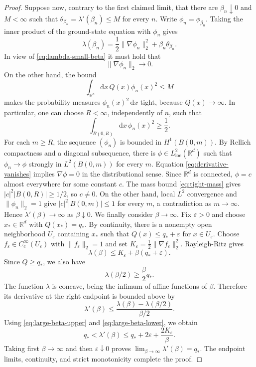 \documentclass[11pt,reqno]{amsart}
\theoremstyle{definition}
\numberwithin{equation}{section}
\newcommand{\<}{\langle}
\renewcommand{\>}{\rangle}
\def\de{{\rm d}}
\def\de{{\mathrm {d}}}
\begin{document}
\begin{appendix}
\begin{proof}
Suppose now, contrary to the first claimed limit, that there are
$\beta_n\downarrow0$ and $M<\infty$ such that $\theta_{\beta_n}=\lambda'(\beta_n)\leq M$ for every $n$.
Write $\phi_n=\phi_{\beta_n}$.  Taking the inner product of the
ground-state equation with $\phi_n$ gives
\[
    \lambda(\beta_n)
    =\frac12\|\nabla\phi_n\|_2^2
      +\beta_n\theta_{\beta_n}.
\]
In view of \eqref{eq:lambda-small-beta} it must hold that
\begin{equation}
    \|\nabla\phi_n\|_2\longrightarrow0.
\label{eq:derivative-vanishes}
\end{equation}
On the other hand, the bound
\[
    \int_{\mathbb R^d}\de x \, Q(x) \phi_n(x)^2 \leq M
\]
makes the probability measures $\phi_n(x)^2\,\mathrm dx$ tight, because
$Q(x)\to\infty$.  In particular, one can choose $R<\infty$, independently
of $n$, such that
\begin{equation}
    \int_{B(0,R)} \de x \, \phi_n(x)^2\geq\frac12.
\label{eq:tight-mass}
\end{equation}
For each $m\geq R$, the sequence $(\phi_n)$ is bounded in $H^1(B(0,m))$.
By Rellich compactness and a diagonal subsequence, there is
$\phi\in L^2_{\mathrm{loc}}(\mathbb R^d)$ such that
$\phi_n\to\phi$ strongly in $L^2(B(0,m))$ for every $m$.  Equation
\eqref{eq:derivative-vanishes} implies $\nabla\phi=0$ in the distributional
sense.  Since $\mathbb R^d$ is connected, $\phi=c$ almost everywhere for
some constant $c$.  The mass bound \eqref{eq:tight-mass} gives
$|c|^2|B(0,R)|\geq1/2$, so $c\neq0$.  On the other hand, local $L^2$
convergence and $\|\phi_n\|_2=1$ give
$|c|^2|B(0,m)|\leq1$ for every $m$, a contradiction as $m\to\infty$.
Hence
$\lambda'(\beta)\to\infty$ as $\beta\downarrow0$.
We finally consider $\beta\to\infty$.  Fix $\varepsilon>0$ and choose
$x_*\in\mathbb R^d$ with $Q(x_*)=q_*$.  By continuity, there is a nonempty
open neighborhood $U_\varepsilon$ containing $x_*$ such that $Q(x)\leq q_*+\varepsilon$ for $x\in U_\varepsilon$.
Choose $f_\varepsilon\in C_c^\infty(U_\varepsilon)$ with
$\|f_\varepsilon\|_2=1$ and set $K_\varepsilon=\frac12\|\nabla f_\varepsilon\|_2^2$.
Rayleigh-Ritz gives
\begin{equation}
    \lambda(\beta)
    \leq K_\varepsilon+\beta(q_*+\varepsilon).
\label{eq:large-beta-upper}
\end{equation}
Since $Q\geq q_*$, we also have
\begin{equation}
    \lambda(\beta/2)\geq\frac\beta2q_*.
\label{eq:large-beta-lower}
\end{equation}
The function $\lambda$ is concave, being the infimum of affine functions of
$\beta$.  Therefore its derivative at the right endpoint is bounded above by
\[
    \lambda'(\beta)
    \leq \frac{\lambda(\beta)-\lambda(\beta/2)}{\beta/2}.
\]
Using \eqref{eq:large-beta-upper} and \eqref{eq:large-beta-lower}, we obtain
\[
    q_*<\lambda'(\beta)
    \leq q_*+2\varepsilon+\frac{2K_\varepsilon}{\beta}.
\]
Taking first $\beta\to\infty$ and then $\varepsilon\downarrow0$ proves $\lim_{\beta\to\infty}\lambda'(\beta)=q_*$.
The endpoint limits, continuity, and strict monotonicity complete the proof.
\end{proof}




\end{appendix}
\end{document}
